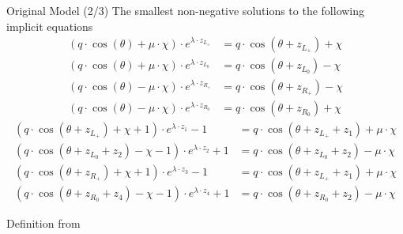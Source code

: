 \begin{frame}{Original Model (2/3)}
	\vspace{-1em}
	The smallest non-negative solutions to the following implicit equations
	\begin{subequations}
		\begin{align}
			(q \cdot \cos(\theta) + \mu \cdot \chi) \cdot e^{\lambda \cdot z_{L_+}}
			 & = q \cdot \cos(\theta + z_{L_+}) + \chi \\
			(q \cdot \cos(\theta) + \mu \cdot \chi) \cdot e^{\lambda \cdot z_{L_0}}
			 & = q \cdot \cos(\theta + z_{L_0}) - \chi \\
			(q \cdot \cos(\theta) - \mu \cdot \chi) \cdot e^{\lambda \cdot z_{R_+}}
			 & = q \cdot \cos(\theta + z_{R_+}) - \chi \\
			(q \cdot \cos(\theta) - \mu \cdot \chi) \cdot e^{\lambda \cdot z_{R_0}}
			 & = q \cdot \cos(\theta + z_{R_0}) + \chi
		\end{align}
	\end{subequations}
	\vspace{-2em}
	\begin{subequations}
		\begin{align}
			(q \cdot \cos(\theta + z_{L_+}) + \chi + 1) \cdot e^{\lambda \cdot z_1} - 1
			 & = q \cdot  \cos(\theta + z_{L_+} + z_1) + \mu \cdot \chi \\
			(q \cdot \cos(\theta + z_{L_0} + z_2) - \chi - 1) \cdot e^{\lambda \cdot z_2} + 1
			 & = q \cdot  \cos(\theta + z_{L_0} + z_2) - \mu \cdot \chi \\
			(q \cdot \cos(\theta + z_{R_+}) + \chi + 1) \cdot e^{\lambda \cdot z_3} - 1
			 & = q \cdot  \cos(\theta + z_{L_+} + z_1) + \mu \cdot \chi \\
			(q \cdot \cos(\theta + z_{R_0} + z_4) - \chi - 1) \cdot e^{\lambda \cdot z_4} + 1
			 & = q \cdot  \cos(\theta + z_{R_0} + z_2) - \mu \cdot \chi
		\end{align}
	\end{subequations}
	\begin{flushright}
		Definition from \cite{akyuz2022}
	\end{flushright}
\end{frame}

